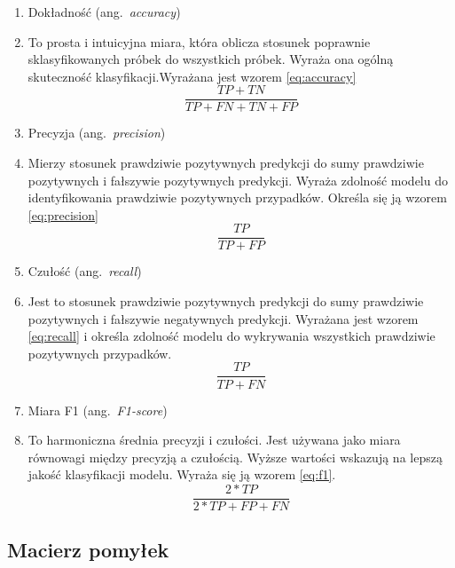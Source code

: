 \begin{enumerate}[label={\alph*)}]
	\item Dokładność (ang.~\emph{accuracy})
    \item [] To prosta i intuicyjna miara, która oblicza stosunek poprawnie sklasyfikowanych próbek do wszystkich próbek. Wyraża ona ogólną skuteczność klasyfikacji.Wyrażana jest wzorem \ref{eq:accuracy}
    \begin{equation}
        \frac{TP + TN}{TP + FN + TN + FP}\label{eq:accuracy}
    \end{equation}
    \item Precyzja (ang.~\emph{precision})
    \item [] Mierzy stosunek prawdziwie pozytywnych predykcji do sumy prawdziwie pozytywnych i  fałszywie pozytywnych predykcji. Wyraża zdolność modelu do identyfikowania prawdziwie pozytywnych przypadków. Określa się ją wzorem \ref{eq:precision}
      \begin{equation}
        \frac{TP}{TP + FP}\label{eq:precision}
    \end{equation}
    \item Czułość (ang.~\emph{recall})
    \item [] Jest to stosunek prawdziwie pozytywnych predykcji do sumy prawdziwie pozytywnych i fałszywie negatywnych predykcji. Wyrażana jest wzorem \ref{eq:recall} i określa zdolność modelu do wykrywania wszystkich prawdziwie pozytywnych przypadków.
    \begin{equation}
        \frac{TP}{TP + FN}\label{eq:recall}
    \end{equation}
    \item Miara F1 (ang.~\emph{F1-score})
    \item [] To harmoniczna średnia precyzji i czułości. Jest używana jako miara równowagi między precyzją a czułością. Wyższe wartości wskazują na lepszą jakość klasyfikacji modelu. Wyraża się ją wzorem \ref{eq:f1}.
  \begin{equation}
        \frac{2 * TP}{2 * TP + FP + FN}\label{eq:f1}
    \end{equation}
\end{enumerate}


\subsection{Macierz pomyłek}
\label{subsec:macierz-pomylek}

